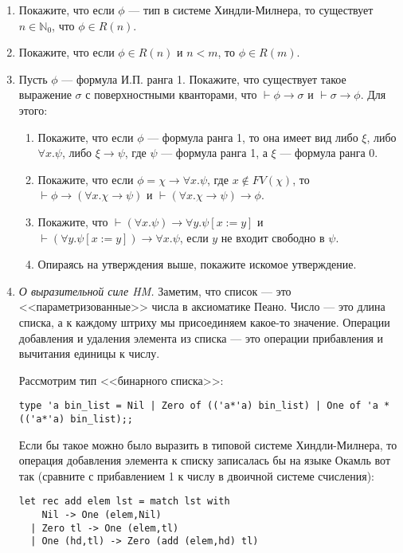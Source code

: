 \documentclass[10pt,a4paper,oneside]{article}
\begin{document}
\begin{enumerate}
\item Покажите, что если $\phi$ --- тип в системе Хиндли-Милнера,
то существует $n\in \mathbb{N}_0$, что $\phi\in R(n)$.

\item Покажите, что если $\phi\in R(n)$ и $n < m$, то $\phi\in R(m)$.

\item Пусть $\phi$ --- формула И.П. ранга 1. Покажите, что существует такое выражение $\sigma$ с поверхностными кванторами,
что $\vdash\phi\rightarrow\sigma$ и $\vdash\sigma\rightarrow\phi$. Для этого:
\begin{enumerate}
\item Покажите, что если $\phi$ --- формула ранга 1, то она имеет вид либо $\xi$, либо $\forall x.\psi$, 
либо $\xi\rightarrow\psi$, где $\psi$ --- формула ранга 1, а $\xi$ --- формула ранга 0.
\item Покажите, что если $\phi = \chi\rightarrow\forall x.\psi$, где $x \notin FV(\chi)$, 
то $\vdash\phi\rightarrow(\forall x.\chi\rightarrow\psi)$ и $\vdash(\forall x.\chi\rightarrow\psi)\rightarrow\phi$.
\item Покажите, что $\vdash (\forall x.\psi)\rightarrow \forall y.\psi[x:=y]$ и $\vdash (\forall y.\psi[x:=y])\rightarrow\forall x.\psi$,
если $y$ не входит свободно в $\psi$.
\item Опираясь на утверждения выше, покажите искомое утверждение.
\end{enumerate}

\item \emph{О выразительной силе HM.} Заметим, что список --- это <<параметризованные>> числа в 
аксиоматике Пеано. Число --- это длина списка, а к каждому штриху мы присоединяем какое-то значение.
Операции добавления и удаления элемента из списка --- это операции прибавления и вычитания
единицы к числу.

Рассмотрим тип <<бинарного списка>>:

\begin{verbatim}
type 'a bin_list = Nil | Zero of (('a*'a) bin_list) | One of 'a * (('a*'a) bin_list);;
\end{verbatim}

Если бы такое можно было выразить в типовой системе Хиндли-Милнера, то операция добавления
элемента к списку записалась бы на языке Окамль вот так (сравните с прибавлением 1 к числу
в двоичной системе счисления):

\begin{verbatim}
let rec add elem lst = match lst with
    Nil -> One (elem,Nil)
  | Zero tl -> One (elem,tl)
  | One (hd,tl) -> Zero (add (elem,hd) tl)
\end{verbatim}


\end{enumerate}
\end{document}
